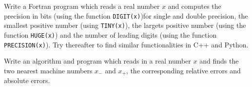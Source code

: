 \begin{prob}
Write a Fortran program which reads a real number $x$ and computes the precision in bits (using the function
\lstinline{DIGIT(x)})for single and double precision, the smallest positive number
(using \lstinline{TINY(x)}), the largets positive number (using the function \lstinline{HUGE(x)})
and the number of leading digits (using the function \lstinline{PRECISION(x)}).  
Try thereafter to find similar functionalities in C++ and Python.
\end{prob}


\begin{prob}
Write an algorithm and program which reads in a real number $x$ and finds the two nearest machine
numbers $x_{-}$ and $x_{+}$, the corresponding relative errors and absolute errors.  
\end{prob}


